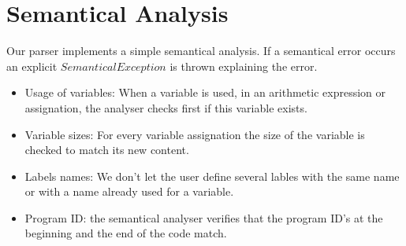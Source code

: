 \newpage\cleardoublepage{}
\section{Semantical Analysis}

Our parser implements a simple semantical analysis. If a semantical error occurs an explicit $SemanticalException$ is thrown explaining the error.

\begin{itemize}

\item Usage of variables: When a variable is used, in an arithmetic expression or assignation, the analyser checks first if this variable exists.
\item Variable sizes: For every variable assignation the size of the variable is checked to match its new content.
\item Labels names: We don't let the user define several lables with the same name or with a name already used for a variable.
\item Program ID: the semantical analyser verifies that the program ID's at the beginning and the end of the code match.


\end {itemize}



